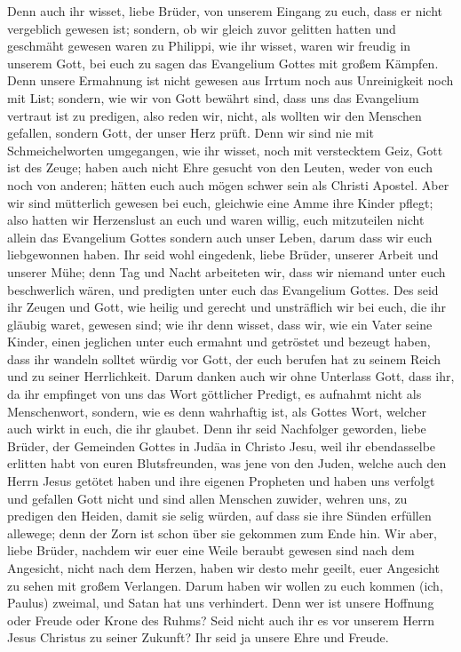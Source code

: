  Denn auch ihr wisset, liebe Brüder, von unserem Eingang
zu euch, dass er nicht vergeblich gewesen ist;  sondern,
ob wir gleich zuvor gelitten hatten und geschmäht gewesen waren zu
Philippi, wie ihr wisset, waren wir freudig in unserem Gott, bei euch zu
sagen das Evangelium Gottes mit großem Kämpfen.  Denn
unsere Ermahnung ist nicht gewesen aus Irrtum noch aus Unreinigkeit noch
mit List;  sondern, wie wir von Gott bewährt sind, dass
uns das Evangelium vertraut ist zu predigen, also reden wir, nicht, als
wollten wir den Menschen gefallen, sondern Gott, der unser Herz prüft.
 Denn wir sind nie mit Schmeichelworten umgegangen, wie
ihr wisset, noch mit verstecktem Geiz, Gott ist des Zeuge;
 haben auch nicht Ehre gesucht von den Leuten, weder von
euch noch von anderen;  hätten euch auch mögen schwer sein
als Christi Apostel. Aber wir sind mütterlich gewesen bei euch,
gleichwie eine Amme ihre Kinder pflegt;  also hatten wir
Herzenslust an euch und waren willig, euch mitzuteilen nicht allein das
Evangelium Gottes sondern auch unser Leben, darum dass wir euch
liebgewonnen haben.  Ihr seid wohl eingedenk, liebe
Brüder, unserer Arbeit und unserer Mühe; denn Tag und Nacht arbeiteten
wir, dass wir niemand unter euch beschwerlich wären, und predigten unter
euch das Evangelium Gottes.  Des seid ihr Zeugen und
Gott, wie heilig und gerecht und unsträflich wir bei euch, die ihr
gläubig waret, gewesen sind;  wie ihr denn wisset, dass
wir, wie ein Vater seine Kinder, einen jeglichen unter euch ermahnt und
getröstet  und bezeugt haben, dass ihr wandeln solltet
würdig vor Gott, der euch berufen hat zu seinem Reich und zu seiner
Herrlichkeit.  Darum danken auch wir ohne Unterlass Gott,
dass ihr, da ihr empfinget von uns das Wort göttlicher Predigt, es
aufnahmt nicht als Menschenwort, sondern, wie es denn wahrhaftig ist,
als Gottes Wort, welcher auch wirkt in euch, die ihr glaubet.
 Denn ihr seid Nachfolger geworden, liebe Brüder, der
Gemeinden Gottes in Judäa in Christo Jesu, weil ihr ebendasselbe
erlitten habt von euren Blutsfreunden, was jene von den Juden,
 welche auch den Herrn Jesus getötet haben und ihre
eigenen Propheten und haben uns verfolgt und gefallen Gott nicht und
sind allen Menschen zuwider,  wehren uns, zu predigen den
Heiden, damit sie selig würden, auf dass sie ihre Sünden erfüllen
allewege; denn der Zorn ist schon über sie gekommen zum Ende hin.
 Wir aber, liebe Brüder, nachdem wir euer eine Weile
beraubt gewesen sind nach dem Angesicht, nicht nach dem Herzen, haben
wir desto mehr geeilt, euer Angesicht zu sehen mit großem Verlangen.
 Darum haben wir wollen zu euch kommen (ich, Paulus)
zweimal, und Satan hat uns verhindert.  Denn wer ist
unsere Hoffnung oder Freude oder Krone des Ruhms? Seid nicht auch ihr es
vor unserem Herrn Jesus Christus zu seiner Zukunft?  Ihr
seid ja unsere Ehre und Freude.

